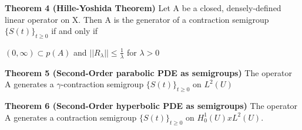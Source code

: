 \documentclass{article}
\begin{document}
\textbf {Theorem 4 (Hille-Yoshida Theorem)} Let A be a closed, densely-defined linear operator on X. Then A is the generator of a contraction semigroup $\{ S(t)\}_{t \geq 0}$ if and only if
\begin{center}
$(0, \infty) \subset p(A)$ and $||R_{\lambda}|| \leq \frac{1}{\lambda}$ for $\lambda > 0$
\end{center}

\textbf {Theorem 5 (Second-Order parabolic PDE as semigroups)} The operator A generates a $\gamma$-contraction semigroup $\{S(t)\}_{t \geq 0}$ on $L^2(U)$

\textbf {Theorem 6 (Second-Order hyperbolic PDE as semigroups)} The operator A generates a contraction semigroup $\{S(t)\}_{t \geq 0}$ on $H_0^1(U) x L^2(U)$.
\end{document}

